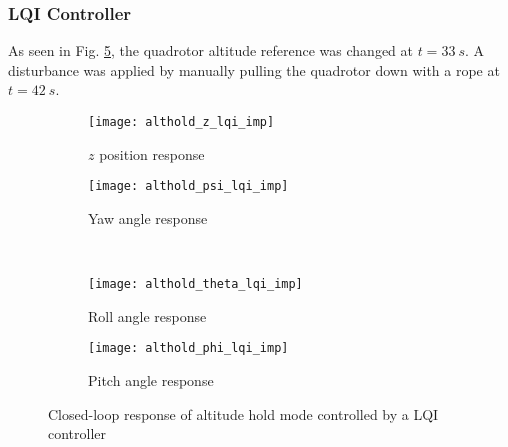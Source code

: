 \subsubsection{LQI Controller}
As seen in Fig. \ref{fig:althold_lqi_imp}, the quadrotor altitude reference was changed at $t = 33\ s$. A disturbance was applied by manually pulling the quadrotor down with a rope at $t = 42\ s$.
\begin{figure}[H]
\begin{subfigure}{.5\linewidth}
\centering
\texttt{[image: althold\_z\_lqi\_imp]}
\caption{$z$ position response}
\label{fig:althold_z_lqi_imp}
\end{subfigure}%
\begin{subfigure}{.5\linewidth}
\centering
\texttt{[image: althold\_psi\_lqi\_imp]}
\caption{Yaw angle response}
\label{fig:althold_psi_lqi_imp}
\end{subfigure}\\[1ex]
\begin{subfigure}{0.5\linewidth}
\centering
\texttt{[image: althold\_theta\_lqi\_imp]}
\caption{Roll angle response}
\label{fig:althold_theta_lqi_imp}
\end{subfigure}
\begin{subfigure}{0.5\linewidth}
\centering
\texttt{[image: althold\_phi\_lqi\_imp]}
\caption{Pitch angle response}
\label{fig:althold_phi_lqi_imp}
\end{subfigure}
\caption{Closed-loop response of altitude hold mode controlled by a LQI controller}
\label{fig:althold_lqi_imp}
\end{figure}


